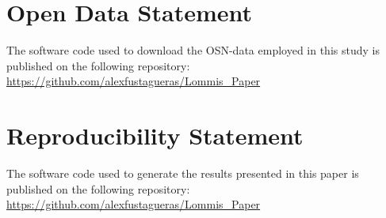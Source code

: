 \documentclass[
  manuscript=proceedings,  %
  layout=preprint,         %
  year=2025,
  volume=x,
]{extra/joas}
\begin{document}
\section*{Open Data Statement}
\label{sec:data}
 The software code used to download the OSN-data employed in this study is published on the following repository: \url{https://github.com/alexfustagueras/Lommis_Paper}

\section*{Reproducibility Statement}
\label{sec:reproducibility}
 The software code used to generate the results presented in this paper is published on the following repository: \url{https://github.com/alexfustagueras/Lommis_Paper}

\printbibliography
\end{document}
